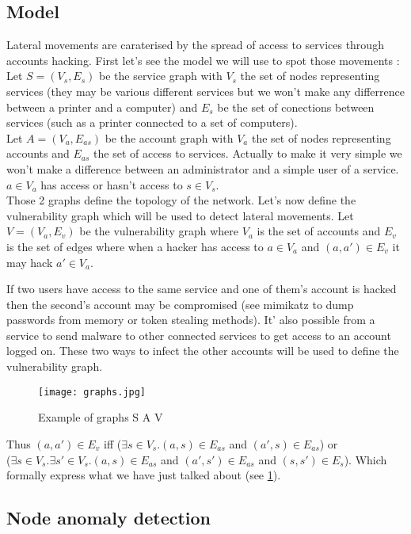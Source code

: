 \documentclass[11pt]{article}
\begin{document}
\subsection{Model}
\indent Lateral movements are caraterised by the spread of access to services through accounts hacking. First let's see the model we will use to spot those movements :\\
\indent Let $S=(V_s,E_s)$ be the service graph with $V_s$ the set of nodes representing services (they may be various different services but we won't make any differrence between a printer and a computer) and $E_s$ be the set of conections between services (such as a printer connected to a set of computers).\\
\indent Let $A=(V_a,E_{as})$ be the account graph with $V_a$ the set of nodes representing accounts and $E_{as}$ the set of access to services. Actually to make it very simple we won't make a difference between an administrator and a simple user of a service. $a\in V_a$ has access or hasn't access to $s\in V_s$.\\
\indent Those 2 graphs define the topology of the network. Let's now define the vulnerability graph which will be used to detect lateral movements. Let $V=(V_a,E_v)$ be the vulnerability graph where $V_a$ is the set of accounts and $E_v$ is the set of edges where when a hacker has access to $a\in V_a$ and $(a,a')\in E_v$ it may hack $a'\in V_a$. 

If two users have access to the same service and one of them's account is hacked then the second's account may be compromised (see mimikatz to dump passwords from memory or token stealing methods). It' also possible from a service to send malware to other connected services to get access to an account logged on. These two ways to infect the other accounts will be used to define the vulnerability graph.

\begin{figure}[!h]
\centering
\texttt{[image: graphs.jpg]}
\caption{Example of graphs S A V}
\label{graphs}
\end{figure}

Thus $(a,a')\in E_v$ iff ($\exists s\in V_s. (a,s)\in E_{as}$ and $(a',s)\in E_{as}$) or\\ ($\exists s\in V_s. \exists s'\in V_s. (a,s)\in E_{as}$ and $(a',s')\in E_{as}$ and $(s,s')\in E_s$). Which formally express what we have just talked about (see \ref{graphs}).

\subsection{Node anomaly detection}
\end{document}

